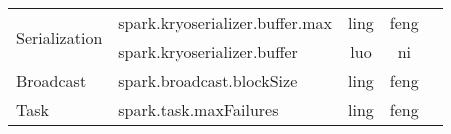 \documentclass[conference]{IEEEtran}
\begin{document}
\begin{table*}[htbp]
\begin{tabular}{llccl}
\multirow{2}{2cm}{Serialization} & spark.kryoserializer.buffer.max & ling & feng \\
& spark.kryoserializer.buffer & luo & ni \\
\hline

\multirow{1}{2cm}{Broadcast} & spark.broadcast.blockSize & ling & feng \\
\hline

\multirow{1}{2cm}{Task} & spark.task.maxFailures & ling & feng \\

\bottomrule
\end{tabular}
\end{table*}
\end{document}
